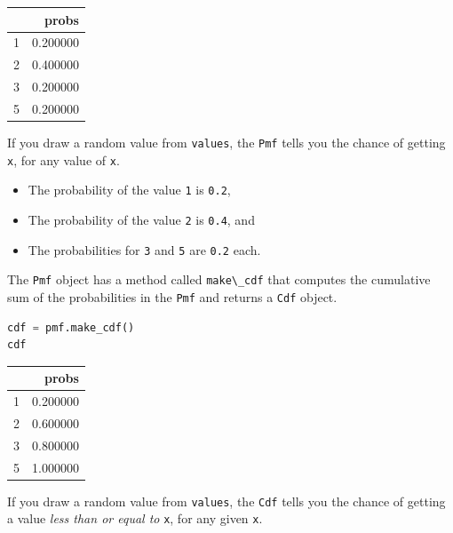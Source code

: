 \documentclass[
]{book}
\newcommand{\passthrough}[1]{#1}
\begin{document}
\begin{tabular}{lr}
\toprule
 & probs \\
\midrule
1 & 0.200000 \\
2 & 0.400000 \\
3 & 0.200000 \\
5 & 0.200000 \\
\bottomrule
\end{tabular}

If you draw a random value from \passthrough{\lstinline!values!}, the
\passthrough{\lstinline!Pmf!} tells you the chance of getting
\passthrough{\lstinline!x!}, for any value of
\passthrough{\lstinline!x!}.

\begin{itemize}
\item
  The probability of the value \passthrough{\lstinline!1!} is
  \passthrough{\lstinline!0.2!},
\item
  The probability of the value \passthrough{\lstinline!2!} is
  \passthrough{\lstinline!0.4!}, and
\item
  The probabilities for \passthrough{\lstinline!3!} and
  \passthrough{\lstinline!5!} are \passthrough{\lstinline!0.2!} each.
\end{itemize}

The \passthrough{\lstinline!Pmf!} object has a method called
\passthrough{\lstinline!make\_cdf!} that computes the cumulative sum of
the probabilities in the \passthrough{\lstinline!Pmf!} and returns a
\passthrough{\lstinline!Cdf!} object.

\begin{lstlisting}[language=Python]
cdf = pmf.make_cdf()
cdf
\end{lstlisting}

\begin{tabular}{lr}
\toprule
 & probs \\
\midrule
1 & 0.200000 \\
2 & 0.600000 \\
3 & 0.800000 \\
5 & 1.000000 \\
\bottomrule
\end{tabular}

If you draw a random value from \passthrough{\lstinline!values!}, the
\passthrough{\lstinline!Cdf!} tells you the chance of getting a value
\emph{less than or equal to} \passthrough{\lstinline!x!}, for any given
\passthrough{\lstinline!x!}.
\end{document}
